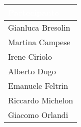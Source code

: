 \setlength{\tabcolsep}{10pt}
\renewcommand{\arraystretch}{1.5}
\begin{tabular}{| l |}
    \hline
    \rowcolor{headerrow}\textbf{\textcolor{white}{Partecipante}} \\
    \hline
    Gianluca Bresolin\\
    \hline
    Martina Campese\\
    \hline
    Irene Ciriolo\\
    \hline
    Alberto Dugo\\
    \hline
    Emanuele Feltrin\\
    \hline
    Riccardo Michelon\\
    \hline
    Giacomo Orlandi\\
    \hline
\end{tabular}
